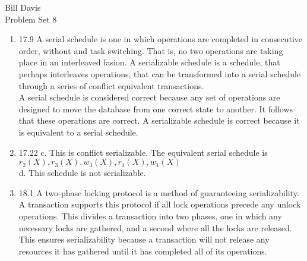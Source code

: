 \documentclass[11pt,fleqn]{article}
\begin{document}
\noindent Bill Davis \\
 Problem Set 8
\begin{enumerate}
\item 17.9 %
A serial schedule is one in which operations are completed in consecutive order, without and task switching. That is, no two operations are taking place in an interleaved fasion. A serializable schedule is a schedule, that perhaps interleaves operations, that can be transformed into a serial schedule through a series of conflict equivalent transactions. \\
A serial schedule is considered correct because any set of operations are designed to move the database from one correct state to another. It follows that these operations are correct. A serializable schedule is correct because it is equivalent to a serial schedule. 

\item  17.22 
c. This is conflict serializable. The equivalent serial schedule is $r_{2}(X), r_{3}(X), w_{3}(X) ,r_{1}(X), w_{1}(X)$ \\
d. This schedule is not serializable. 

\item 18.1 A two-phase locking protocol is a method of guaranteeing serializability. A transaction supports this protocol if all lock operations precede any unlock operations. This divides a transaction into two phases, one in which any necessary locks are gathered, and a second where all the locks are released. This ensures serializability because a transaction will not release any resources it has gathered until it has completed all of its operations. 


\end{enumerate}
\end{document}
